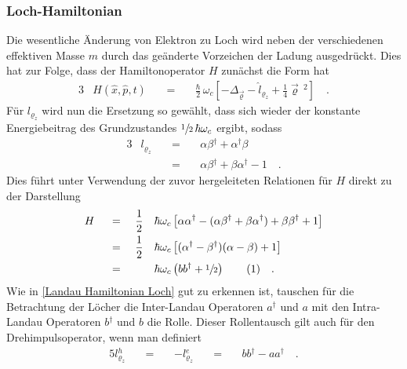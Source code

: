 \documentclass[a4paper,11pt, twoside]{article}
\newcommand{\ind}[2]{{_{#1}^{#2}}}
\newcommand{\+}{\dagger}
\newcommand\numberthis{\stepcounter{equation}  \tag{\theequation}} %
\renewcommand{\'}{\tt\textquotesingle}
\renewcommand{\v}{\vec}
\renewcommand{\^}{\hat}
\renewcommand{\~}{\widetilde}
\begin{document}
\subsubsection{Loch-Hamiltonian}
Die wesentliche Änderung von Elektron zu Loch wird neben der verschiedenen effektiven Masse $m$ durch das geänderte Vorzeichen der Ladung ausgedrückt. Dies hat zur Folge, dass der Hamiltonoperator $H$ zunächst die Form hat 
\begin{alignat*}{3}
& H(\^ x,\^ p,t) && \ = \ && \frac{\hbar }{2}\,\omega_c \left [ -\Delta_{\v \varrho} - \^l_{\varrho_z}  +\frac{1}{4}\v \varrho \,^2 \right]\quad .
\end{alignat*}
Für $l_{\varrho_z}$ wird nun die Ersetzung so gewählt, dass sich wieder der konstante Energiebeitrag des Grundzustandes $\sfrac{1}{2}\,\hbar \omega_c$ ergibt, sodass 
\begin{alignat*}{3}
& l_{\varrho_z} &&\ = \ &&\alpha\beta\ind{}{\+} + \alpha\ind{}{\+}\beta \\
& &&\ =\ &&\alpha\beta\ind{}{\+} + \beta\alpha\ind{}{\+} -1 \quad .
\end{alignat*}
Dies führt unter Verwendung der zuvor hergeleiteten Relationen für $H$ direkt zu der Darstellung 
\begin{alignat*}{4}
& H &&\ = \ && \frac{1}{2}&&\hbar\omega_c \left [\alpha\alpha\ind{}{\+} -( \alpha\beta\ind{}{\+} +\beta\alpha\ind{}{\+})+\beta\beta\ind{}{\+}+1\right ] \\
& &&\ = \ && \frac{1}{2}&&\hbar\omega_c \left [(\alpha\ind{}{\+}-\beta\ind{}{\+})(\alpha-\beta)+1\right ] \\
& &&\ = \ && &&\hbar\omega_c \left (bb\ind{}{\+}+\sfrac{1}{2}\right )\numberthis \label{Landau Hamiltonian Loch} \quad .
\end{alignat*}
Wie in \ref{Landau Hamiltonian Loch} gut zu erkennen ist, tauschen für die Betrachtung der Löcher die Inter-Landau Operatoren $a\ind{}{\+}$ und $a$ mit den Intra-Landau Operatoren $b\ind{}{\+}$ und $b$ die Rolle. Dieser Rollentausch gilt auch für den Drehimpulsoperator, wenn man definiert 
\begin{alignat*}{5}
l\ind{\varrho_z}{h} &&\ =\ && -l\ind{\varrho_z}{e} &&\ = \ && bb\ind{}{\+}-aa\ind{}{\+} \quad .
\end{alignat*}
\end{document}
